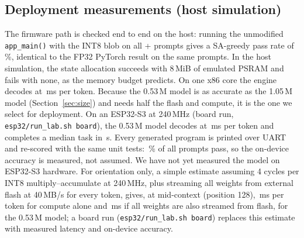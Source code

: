 \subsection{Deployment measurements (host simulation)}
The firmware path is checked end to end on the host: running the unmodified \texttt{app\_main()} with the INT8 blob on all \ntestid{}+\ntestood{} prompts gives a SA-greedy pass rate of \dephostsimgreedypasspct\,\%, identical to the FP32 PyTorch result on the same prompts. In the host simulation, the state allocation succeeds with 8\,MiB of emulated PSRAM and fails with none, as the memory budget predicts. On one x86 core the engine decodes at \dephostdecodemspertoken\,ms per token. Because the 0.53\,M model is as accurate as the 1.05\,M model (Section~\ref{sec:size}) and needs half the flash and compute, it is the one we select for deployment. \ifdefined\devdecode
On an ESP32-S3 at 240\,MHz (board run, \texttt{esp32/run\_lab.sh board}), the 0.53\,M model decodes at \devdecode\,ms per token and completes a median task in \devendtoend\,s. Every generated program is printed over UART and re-scored with the same unit tests: \devpass\,\% of all \devn{} prompts pass, so the on-device accuracy is measured, not assumed.
\else
We have not yet measured the model on ESP32-S3 hardware. For orientation only, a simple estimate assuming 4 cycles per INT8 multiply--accumulate at 240\,MHz, plus streaming all weights from external flash at 40\,MB/s for every token, gives, at mid-context (position 128), \estlo\,ms per token for compute alone and \esthi\,ms if all weights are also streamed from flash, for the 0.53\,M model; a board run (\texttt{esp32/run\_lab.sh board}) replaces this estimate with measured latency and on-device accuracy.
\fi

